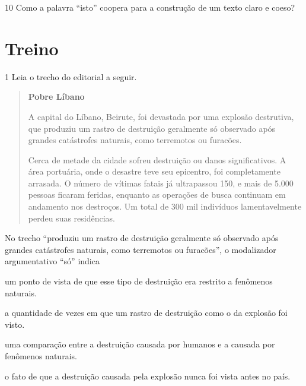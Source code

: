 
\num{10} Como a palavra ``isto'' coopera para a construção de um texto
claro e coeso?


\section{Treino}

\num{1} Leia o trecho do editorial a seguir.

\begin{quote}
\textbf{Pobre Líbano}

A capital do Líbano, Beirute, foi devastada por uma explosão destrutiva,
que produziu um rastro de destruição geralmente só observado após
grandes catástrofes naturais, como terremotos ou furacões.

Cerca de metade da cidade sofreu destruição ou danos significativos. A
área portuária, onde o desastre teve seu epicentro, foi completamente
arrasada. O número de vítimas fatais já ultrapassou 150, e mais de 5.000
pessoas ficaram feridas, enquanto as operações de busca continuam em
andamento nos destroços. Um total de 300 mil indivíduos lamentavelmente
perdeu suas residências.

\end{quote}

No trecho ``produziu um rastro de destruição geralmente só observado
após grandes catástrofes naturais, como terremotos ou furacões'', o
modalizador argumentativo ``só'' indica

\begin{escolha}
\item um ponto de vista de que esse tipo de destruição era restrito a
fenômenos naturais.

\item a quantidade de vezes em que um rastro de destruição como o da
explosão foi visto.

\item uma comparação entre a destruição causada por humanos e a causada
por fenômenos naturais.

\item o fato de que a destruição causada pela explosão nunca foi vista
antes no país.
\end{escolha}

